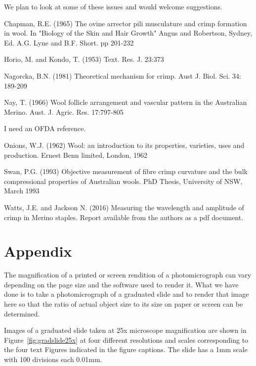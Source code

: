 \documentclass[titlepage,10pt]{article}  %
\begin{document}
We plan to look at some of these issues and would welcome suggestions.


\begin{thebibliography}{99}

Chapman, R.E. (1965) The ovine arrector pili musculature and crimp formation 
    in wool. In "Biology of the Skin and Hair Growth" Angus and Robertson,
    Sydney, Ed. A.G. Lyne and B.F. Short. pp 201-232

Horio, M. and Kondo, T. (1953) Text. Res. J. 23:373


Nagorcka, B.N. (1981) Theoretical mechanism for crimp.
     Aust J. Biol. Sci. 34: 189-209
 
Nay, T. (1966) Wool follicle arrangement and vascular pattern in the 
     Australian Merino. Aust. J. Agric. Res. 17:797-805

I need an OFDA reference.

Onions, W.J. (1962) Wool: an introduction to its properties, varieties, uses
     and production. Ernest Benn limited, London, 1962

Swan, P.G. (1993) Objective measurement of fibre crimp curvature and the bulk compressional properties of Australian wools. PhD Thesis, University of NSW, March 1993 

Watts, J.E. and Jackson N. (2016) Measuring the wavelength and amplitude of crimp in Merino staples.   Report available from the authors as a pdf document.

\end{thebibliography}

\appendix
\section{Appendix}
The magnification of a printed or screen rendition of a photomicrograph can vary depending on the page size and the software used to render it. What we have done is to take a photomicrograph of a graduated slide and to render that image here so that the ratio of actual object size to its size on paper or screen can be determined. 

Images of a graduated slide taken at 25x microscope magnification are shown in Figure~\ref{fig:gradslide25x} at four different resolutions and scales corresponding to the four text Figures indicated in the figure captions. The slide has a 1mm scale with 100 divisions each 0.01mm.
\end{document}

